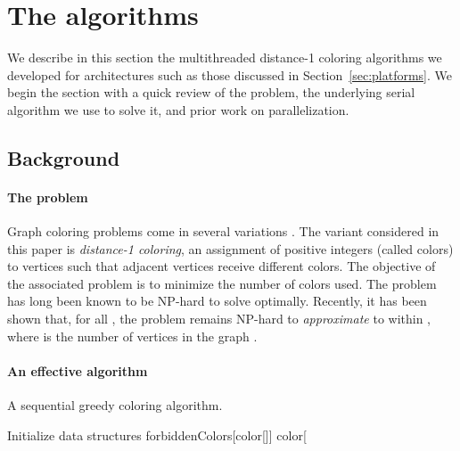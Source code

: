 \documentclass{article}
\begin{document}
\section {The algorithms}
\label{sec:algorithms}

We describe in this section the multithreaded distance-1 coloring algorithms  
we developed for architectures such as those discussed in Section~\ref{sec:platforms}. 
We begin the section with a quick review of the problem, 
the underlying serial algorithm we use to solve it, and prior work on parallelization. 

\subsection{Background}
\label{sec:problem}

\paragraph{The problem}
Graph coloring problems come in several variations \cite{GMP05}.
The variant considered in this paper is {\em distance-1 coloring}, an assignment of  
positive integers (called colors)  to vertices such that  adjacent vertices 
receive different colors.
The objective of the associated  problem is to minimize the number of colors used.
The problem has long been known to be NP-hard to solve optimally.
Recently, it has been shown that, for all , 
the problem remains NP-hard to {\em approximate} to within ,
where  is the number of vertices in the graph \cite{Zuckerman}.  

\paragraph{An effective algorithm}
\label{sec:sequential}

\begin{algorithm}[t]
\small
\caption{A sequential greedy coloring algorithm.}
\label{algorithm.greedy}
\begin{algorithmic}[1]
  \State Initialize data structures
      \State \textsf{forbiddenColors}[\textsf{color}[]]   \label{l:forbid}
      \EndFor
      \State       \label{l:scolor}  
      \State \textsf{color}[   \label{l:assign}
   \EndFor
\EndProcedure
\end{algorithmic}
\end{algorithm}
\end{document}
